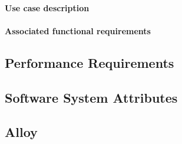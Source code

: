 \paragraph{Use case description}

\paragraph{Associated functional requirements}

\subsection{Performance Requirements}

\subsection{Software System Attributes}

\subsection{Alloy}